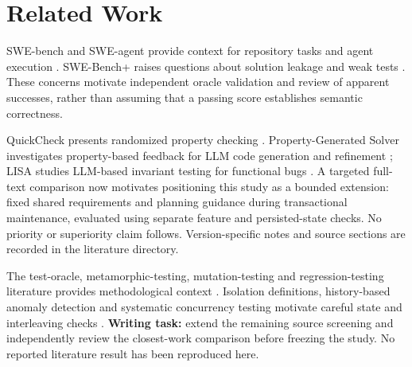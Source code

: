 \section{Related Work}
SWE-bench and SWE-agent provide context for repository tasks and agent execution
\cite{swe-bench,swe-agent}. SWE-Bench+ raises questions about solution leakage and weak tests
\cite{swe-bench-plus}. These concerns motivate independent oracle validation and review of apparent
successes, rather than assuming that a passing score establishes semantic correctness.

QuickCheck presents randomized property checking \cite{quickcheck}. Property-Generated Solver
investigates property-based feedback for LLM code generation and refinement
\cite{property-generated-solver-v1,property-generated-solver-v2}; LISA studies LLM-based invariant
testing for functional bugs \cite{lisa}. A targeted full-text comparison now motivates positioning
this study as a bounded extension: fixed shared requirements and planning guidance during transactional
maintenance, evaluated using separate feature and persisted-state checks. No priority or superiority
claim follows. Version-specific notes and source sections are recorded in the literature directory.

The test-oracle, metamorphic-testing, mutation-testing and regression-testing literature provides
methodological context \cite{test-oracles,metamorphic-testing,mutation-testing,regression-testing}.
Isolation definitions, history-based anomaly detection and systematic concurrency testing motivate
careful state and interleaving checks \cite{sql-isolation,elle,chess}.
\textbf{Writing task:} extend the remaining source screening and independently review the closest-work
comparison before freezing the study. No reported literature result has been reproduced here.
